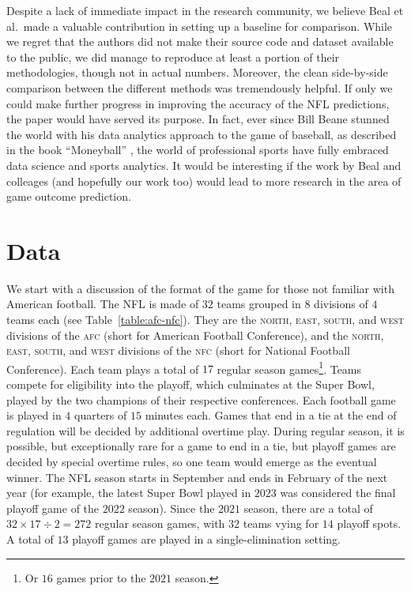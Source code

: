 \documentclass[10pt]{article}
\begin{document}
Despite a lack of immediate impact in the research community, we believe Beal et al.~made
a valuable contribution in setting up a baseline for comparison. While we regret that the
authors did not make their source code and dataset available to the public, we did manage
to reproduce at least a portion of their methodologies, though not in actual numbers.
Moreover, the
clean side-by-side comparison between the different methods was tremendously helpful.
If only we could make further progress in improving the accuracy of the NFL predictions,
the paper would have served its purpose.
In fact, ever since Bill Beane stunned the 
world with his data analytics approach to the game of baseball, as described in the
book ``Moneyball'' \cite{Lewis2004}, the world of professional sports have fully embraced 
data science and sports analytics. It would be interesting if the work by Beal
and colleages (and hopefully
our work too) would lead to more research in the area of game outcome prediction.


\section{Data}

We start with a discussion of the format of the game for those not familiar with American
football. The NFL is made of $32$ teams grouped in $8$ divisions of $4$ teams each
(see Table~\ref{table:afc-nfc}).
They are the
\textsc{north}, \textsc{east}, \textsc{south}, and \textsc{west} divisions of the
\textsc{afc} (short for American Football Conference), and the
\textsc{north}, \textsc{east}, \textsc{south}, and \textsc{west} divisions of the
\textsc{nfc} (short for National Football Conference).
Each
team plays a total of $17$ regular season games\footnote{Or $16$ games prior to the
$2021$ season.}. Teams compete for eligibility into the playoff, which culminates at the
Super Bowl, played by the two champions of their respective conferences.
Each football game is played in $4$ quarters of $15$ minutes each. Games
that end in a tie at the end of regulation will be decided by additional overtime play. During
regular season, it is possible, but exceptionally rare for a game to end in a tie,
but playoff games are decided by special overtime rules, so one team would
emerge as the eventual
winner. The NFL season starts in September and ends in February of the next
year (for example, the latest Super Bowl played in $2023$ was considered the final
playoff game of the $2022$ season).
Since the
$2021$ season, there are a total
of $32\times 17 \div 2 = 272$ regular season games, with $32$ teams vying for $14$ playoff
spots. A total of $13$ playoff games are played in a single-elimination setting.
\end{document}
